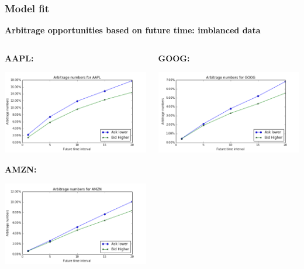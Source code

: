 \documentclass[xcolor={x11names,svgnames,dvipsnames}]{beamer}
\begin{document}
\begin{frame}
\frametitle{Model fit}
\textbf{Arbitrage opportunities based on future time: \alert{imblanced data}}
\begin{columns}		
		\begin{column}{.5\textwidth}
		   \textbf{AAPL:}

						\includegraphics[width=1\textwidth, height=0.4\textheight]{AAPL_arbitrage_time.png}

			 \textbf{AMZN:}

									\includegraphics[width=1\textwidth, height=0.4\textheight]{AMZN_arbitrage_time.png}

		\end{column}
		\begin{column}{.5\textwidth}
			 \textbf{GOOG:}

									\includegraphics[width=1\textwidth, height=0.4\textheight]{GOOG_arbitrage_time.png}


\end{column}
\end{columns}
\end{frame}
\end{document}
